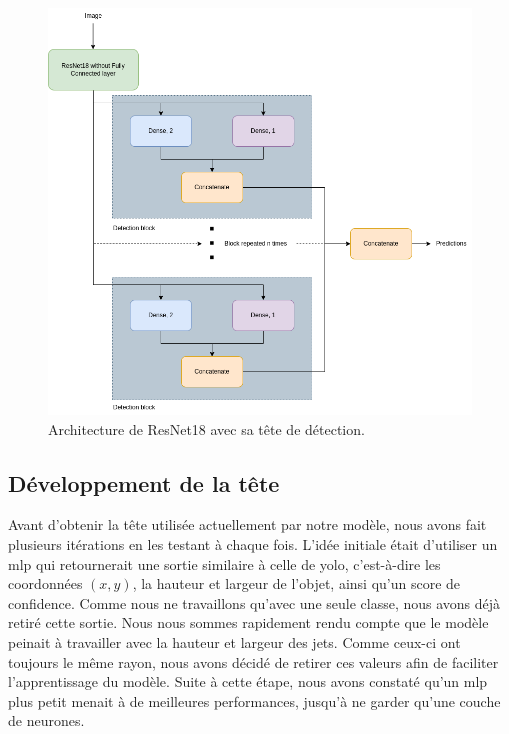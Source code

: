 \newpage

\begin{figure}[hbt!]
    \centering
    \includegraphics[scale=0.5]{Figures/resnet18+head_architecture.png}
    \caption{Architecture de ResNet18 avec sa tête de détection.}
    \label{fig:resnet18+head_architecture}
\end{figure}

\subsection{Développement de la tête}

Avant d'obtenir la tête utilisée actuellement par notre modèle, nous avons fait plusieurs itérations en les testant à chaque fois. L'idée initiale était d'utiliser un \acrshort{mlp} qui retournerait une sortie similaire à celle de \acrshort{yolo}, c'est-à-dire les coordonnées $(x, y)$, la hauteur et largeur de l'objet, ainsi qu'un score de confidence. Comme nous ne travaillons qu'avec une seule classe, nous avons déjà retiré cette sortie. Nous nous sommes rapidement rendu compte que le modèle peinait à travailler avec la hauteur et largeur des jets. Comme ceux-ci ont toujours le même rayon, nous avons décidé de retirer ces valeurs afin de faciliter l'apprentissage du modèle. Suite à cette étape, nous avons constaté qu'un \acrshort{mlp} plus petit menait à de meilleures performances, jusqu'à ne garder qu'une couche de neurones.

